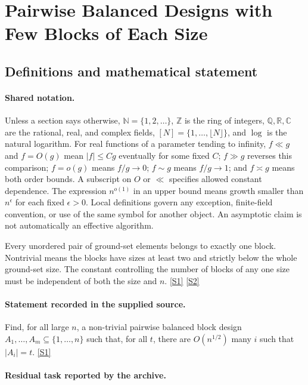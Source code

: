 \documentclass[11pt,a4paper]{article}
\newcommand{\N}{\mathbb{N}}
\newcommand{\Z}{\mathbb{Z}}
\newcommand{\Q}{\mathbb{Q}}
\newcommand{\R}{\mathbb{R}}
\newcommand{\C}{\mathbb{C}}
\newcommand{\sref}[2]{\hyperlink{source:#1:#2}{[S#2]}}
\begin{document}
\section{Pairwise Balanced Designs with Few Blocks of Each Size}\label{statement}


\subsection{Definitions and mathematical statement}

\paragraph{Shared notation.}Unless a section says otherwise, $\N=\{1,2,\ldots\}$,
$\Z$ is the ring of integers, $\Q,\R,\C$ are the rational, real, and complex
fields, $[N]=\{1,\ldots,\lfloor N\rfloor\}$, and $\log$ is the natural
logarithm. For real functions of a parameter tending to infinity,
$f\ll g$ and $f=O(g)$ mean $|f|\leq Cg$ eventually for some fixed $C$;
$f\gg g$ reverses this comparison; $f=o(g)$ means $f/g\to0$;
$f\sim g$ means $f/g\to1$; and $f\asymp g$ means both order bounds.
A subscript on $O$ or $\ll$ specifies allowed constant dependence.
The expression $n^{o(1)}$ in an upper bound means growth smaller than
$n^\epsilon$ for each fixed $\epsilon>0$. Local definitions govern any
exception, finite-field convention, or use of the same symbol for another
object. An asymptotic claim is not automatically an effective algorithm.



Every unordered pair of ground-set elements belongs to exactly one block. Nontrivial means the blocks have sizes at least two and strictly below the whole ground-set size. The constant controlling the number of blocks of any one size must be independent of both the size and $n$. \sref{statement}{1} \sref{statement}{2}

\paragraph{Statement recorded in the supplied source.}
Find, for all large $n$, a non-trivial pairwise balanced block design $A_1,\ldots,A_m\subseteq \{1,\ldots,n\}$ such that, for all $t$, there are $O(n^{1/2})$ many $i$ such that $\lvert A_i\rvert=t$. \sref{statement}{1}

\paragraph{Residual task reported by the archive.}
\end{document}
